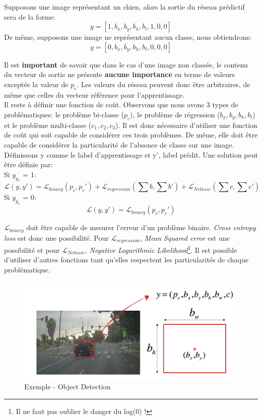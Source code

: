 \noindent Supposons une image représentant un chien, alors la sortie du réseau prédictif sera de la forme: $$y=[1,b_x,b_y,b_h,b_l,1,0,0]$$
\noindent De même, supposons une image ne représentant aucun classe, nous obtiendrons:
$$y=[0,b_x,b_y,b_h,b_l,0,0,0]$$

\noindent Il est \textbf{important} de savoir que dans le cas d'une image non classée, le contenu du vecteur de sortie ne présente \textbf{aucune importance} en terme de valeurs exceptée la valeur de $p_c$. Les valeurs du réseau peuvent donc être arbitraires, de même que celles du vecteur référence pour l'apprentissage.\\

\noindent Il reste à définir une fonction de coût. Observons que nous avons 3 types de problématiques: le problème bi-classe ($p_c$), le problème de régression ($b_x,b_y,b_h,b_l$) et le problème multi-classe ($c_1,c_2,c_3$). Il est donc nécessaire d'utiliser une fonction de coût qui soit capable de considérer ces trois problèmes. De même, elle doit être capable de considérer la particularité de l'absence de classe sur une image.\\

\noindent Définissons y comme le label d'apprentissage et y', label prédit. Une solution peut être définie par:\\

\noindent Si $y_{p_c}$ = 1:
$$\mathcal{L}(y,y')=\mathcal{L}_{binary}(p_c,p_c')+\mathcal{L}_{regression}(\sum b, \sum b')+\mathcal{L}_{Nclasse}(\sum c, \sum c')$$
\noindent Si $y_{p_c}$ = 0:
$$\mathcal{L}(y,y')=\mathcal{L}_{binary}(p_c,p_c')$$

\noindent $\mathcal{L}_{binary}$ doit être capable de mesurer l'erreur d'un problème binaire. \textit{Cross entropy loss} est donc une possibilité. Pour $\mathcal{L}_{regression}$, \textit{Mean Squared error} est une possibilité et pour $\mathcal{L}_{Nclasse}$, \textit{Negative Logarithmic Likelihood}\footnote{Il ne faut pas oublier le danger du log(0) !}. Il est possible d'utiliser d'autres fonctions tant qu'elles respectent les particularités de chaque problématique.

\begin{figure}
    \centering
    \includegraphics[scale=0.3]{./tex/computer-vision/object-recognition/detepi.png}
    \caption{Exemple - Object Detection}
    \label{objdetec}
\end{figure}

